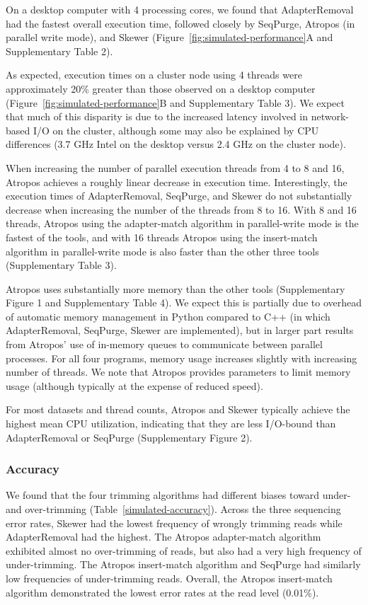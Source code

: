 \documentclass[fleqn,10pt,lineno]{wlpeerj} %
\begin{document}
On a desktop computer with 4 processing cores, we found that AdapterRemoval had the fastest overall execution time, followed closely by SeqPurge, Atropos (in parallel write mode), and Skewer (Figure~\ref{fig:simulated-performance}A and Supplementary Table 2). 

As expected, execution times on a cluster node using 4 threads were approximately 20\% greater than those observed on a desktop computer (Figure~\ref{fig:simulated-performance}B and Supplementary Table 3). We expect that much of this disparity is due to the increased latency involved in network-based I/O on the cluster, although some may also be explained by CPU differences (3.7 GHz Intel on the desktop versus 2.4 GHz on the cluster node). 



When increasing the number of parallel execution threads from 4 to 8 and 16, Atropos achieves a roughly linear decrease in execution time. Interestingly, the execution times of AdapterRemoval, SeqPurge, and Skewer do not substantially decrease when increasing the number of the threads from 8 to 16. With 8 and 16 threads, Atropos using the adapter-match algorithm in parallel-write mode is the fastest of the tools, and with 16 threads Atropos using the insert-match algorithm in parallel-write mode is also faster than the other three tools (Supplementary Table 3).

Atropos uses substantially more memory than the other tools (Supplementary Figure 1 and Supplementary Table 4). We expect this is partially due to overhead of automatic memory management in Python compared to C++ (in which AdapterRemoval, SeqPurge, Skewer are implemented), but in larger part results from Atropos' use of in-memory queues to communicate between parallel processes. For all four programs, memory usage increases slightly with increasing number of threads. We note that Atropos provides parameters to limit memory usage (although typically at the expense of reduced speed).

For most datasets and thread counts, Atropos and Skewer typically achieve the highest mean CPU utilization, indicating that they are less I/O-bound than AdapterRemoval or SeqPurge (Supplementary Figure 2).

\subsubsection{Accuracy}

We found that the four trimming algorithms had different biases toward under- and over-trimming (Table~\ref{simulated-accuracy}). Across the three sequencing error rates, Skewer had the lowest frequency of wrongly trimming reads while AdapterRemoval had the highest. The Atropos adapter-match algorithm exhibited almost no over-trimming of reads, but also had a very high frequency of under-trimming. The Atropos insert-match algorithm and SeqPurge had similarly low frequencies of under-trimming reads. Overall, the Atropos insert-match algorithm demonstrated the lowest error rates at the read level (0.01\%).
\end{document}
